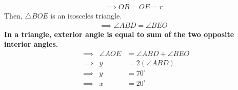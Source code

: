 \documentclass[journal,12pt,twocolumn]{IEEEtran}
\begin{document}
\begin{enumerate}[label=,ref=]
 \begin {align} 
\implies OB=OE=r
\end{align} 
Then, $\triangle BOE$ is an isosceles triangle.\\
 \begin{align} 
 \implies \angle ABD=\angle BEO
 \end{align}  
\textbf{In a triangle, exterior angle is equal to sum of the two opposite interior angles.}\\
\begin{align}
&\implies &\angle AOE&=\angle ABD+\angle BEO\\
&\implies &y&=2(\angle ABD)\\
&\implies &y&=70^\circ\\
&\implies &x&=20^\circ
\end{align}  

 
 
                
\end{enumerate}
\end{document}
